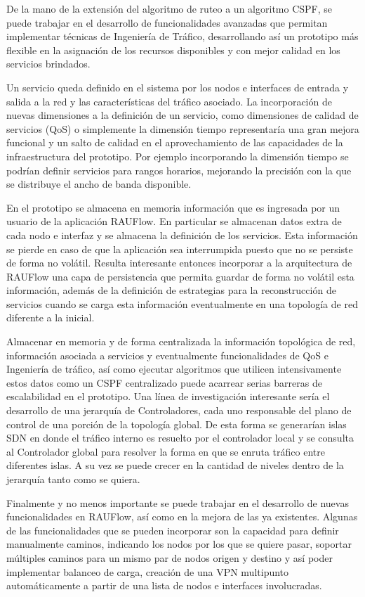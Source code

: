De la mano de la extensi\'on del algoritmo de ruteo a un algoritmo CSPF, se puede trabajar en el desarrollo de funcionalidades avanzadas que permitan implementar t\'ecnicas de Ingenier\'ia de Tr\'afico, desarrollando as\'i un prototipo m\'as flexible en la asignaci\'on de los recursos disponibles y con mejor calidad en los servicios brindados.

Un servicio queda definido en el sistema por los nodos e interfaces de entrada y salida a la red y las caracter\'isticas del tr\'afico asociado. La incorporaci\'on de nuevas dimensiones a la definici\'on de un servicio, como dimensiones de calidad de servicios (QoS) o simplemente la dimensi\'on tiempo representar\'ia una gran mejora funcional y un salto de calidad en el aprovechamiento de las capacidades de la infraestructura del prototipo. Por ejemplo incorporando la dimensi\'on tiempo se podr\'ian definir servicios para rangos horarios, mejorando la precisi\'on con la que se distribuye el ancho de banda disponible.

En el prototipo se almacena en memoria informaci\'on que es ingresada por un usuario de la aplicaci\'on RAUFlow. En particular se almacenan datos extra de cada nodo e interfaz y se almacena la definici\'on de los servicios. Esta informaci\'on se pierde en caso de que la aplicaci\'on sea interrumpida puesto que no se persiste de forma no volátil. Resulta interesante entonces incorporar a la arquitectura de RAUFlow una capa de persistencia que permita guardar de forma no vol\'atil esta informaci\'on, adem\'as de la definici\'on de estrategias para la reconstrucci\'on de servicios cuando se carga esta informaci\'on eventualmente en una topolog\'ia de red diferente a la inicial.

Almacenar en memoria y de forma centralizada la informaci\'on topol\'ogica de red, informaci\'on asociada a servicios y eventualmente funcionalidades de QoS e Ingenier\'ia de tr\'afico, as\'i como ejecutar algoritmos que utilicen intensivamente estos datos como un CSPF centralizado puede acarrear serias barreras de escalabilidad en el prototipo. Una l\'inea de investigaci\'on interesante ser\'ia el desarrollo de una jerarqu\'ia de Controladores, cada uno responsable del plano de control de una porci\'on de la topolog\'ia global. De esta forma se generar\'ian islas SDN en donde el tr\'afico interno es resuelto por el controlador local y se consulta al Controlador global para resolver la forma en que se enruta tr\'afico entre diferentes islas. A su vez se puede crecer en la cantidad de niveles dentro de la jerarqu\'ia tanto como se quiera.

Finalmente y no menos importante se puede trabajar en el desarrollo de nuevas funcionalidades en RAUFlow, así como en la mejora de las ya existentes. Algunas de las funcionalidades que se pueden incorporar son la capacidad para definir manualmente caminos, indicando los nodos por los que se quiere  
pasar, soportar m\'ultiples caminos para un mismo par de nodos origen y destino y as\'i poder implementar balanceo de carga, creaci\'on de una VPN multipunto autom\'aticamente a partir de una lista de nodos e interfaces involucradas. 

